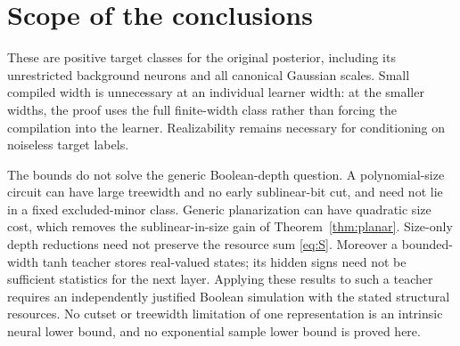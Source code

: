\documentclass[11pt]{article}
\theoremstyle{remark}\newtheorem{remark}[theorem]{Remark}
\begin{document}
\section{Scope of the conclusions}
These are positive target classes for the original posterior,
including its unrestricted background neurons and all canonical
Gaussian scales. Small compiled width is unnecessary at an
individual learner width: at the smaller widths, the proof uses
the full finite-width class rather than forcing the compilation
into the learner. Realizability remains necessary for conditioning
on noiseless target labels.

The bounds do not solve the generic Boolean-depth question.
A polynomial-size circuit can have large treewidth and no early
sublinear-bit cut, and need not lie in a fixed excluded-minor class.
Generic planarization can have quadratic size cost, which removes
the sublinear-in-size gain of Theorem~\ref{thm:planar}.
Size-only depth reductions need not preserve
the resource sum \eqref{eq:S}. Moreover a bounded-width tanh
teacher stores real-valued states; its hidden signs need not be
sufficient statistics for the next layer. Applying these results
to such a teacher requires an independently justified Boolean
simulation with the stated structural resources. No cutset or
treewidth limitation of one representation is an intrinsic neural
lower bound, and no exponential sample lower bound is proved here.
\end{document}
